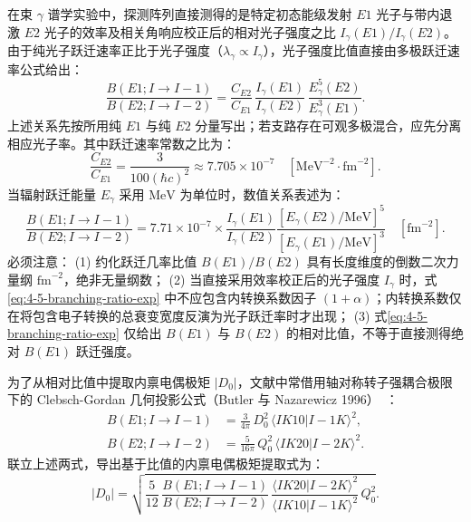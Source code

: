 在束 $\gamma$ 谱学实验中，探测阵列直接测得的是特定初态能级发射 $E1$ 光子与带内退激 $E2$ 光子的效率及相关角响应校正后的相对光子强度之比 $I_\gamma(E1)/I_\gamma(E2)$。由于纯光子跃迁速率正比于光子强度（$\lambda_\gamma \propto I_\gamma$），光子强度比值直接由多极跃迁速率公式给出：
\begin{equation}\label{eq:4-5-branching-ratio-exp}
\frac{B(E1; I \to I-1)}{B(E2; I \to I-2)} = \frac{C_{E2}}{C_{E1}} \, \frac{I_\gamma(E1)}{I_\gamma(E2)} \, \frac{E_\gamma^5(E2)}{E_\gamma^3(E1)} .
\end{equation}
上述关系先按所用纯 $E1$ 与纯 $E2$ 分量写出；若支路存在可观多极混合，应先分离相应光子率。其中跃迁速率常数之比为：
\begin{equation}\label{eq:4-5-rate-constant-ratio}
\frac{C_{E2}}{C_{E1}} = \frac{3}{100 (\hbar c)^2} \approx 7.705 \times 10^{-7} \quad [\mathrm{MeV}^{-2} \cdot \mathrm{fm}^{-2}] .
\end{equation}
当辐射跃迁能量 $E_\gamma$ 采用 $\mathrm{MeV}$ 为单位时，数值关系表述为：
\begin{equation}\label{eq:4-5-ratio-mev}
\frac{B(E1; I \to I-1)}{B(E2; I \to I-2)} = 7.71 \times 10^{-7} \times \frac{I_\gamma(E1)}{I_\gamma(E2)} \frac{[E_\gamma(E2)/\mathrm{MeV}]^5}{[E_\gamma(E1)/\mathrm{MeV}]^3} \quad [\mathrm{fm}^{-2}] .
\end{equation}
必须注意：
(1) 约化跃迁几率比值 $B(E1)/B(E2)$ 具有长度维度的倒数二次力量纲 $\mathrm{fm}^{-2}$，绝非无量纲数；
(2) 当直接采用效率校正后的光子强度 $I_\gamma$ 时，式\eqref{eq:4-5-branching-ratio-exp} 中不应包含内转换系数因子 $(1+\alpha)$；内转换系数仅在将包含电子转换的总衰变宽度反演为光子跃迁率时才出现；
(3) 式\eqref{eq:4-5-branching-ratio-exp} 仅给出 $B(E1)$ 与 $B(E2)$ 的相对比值，不等于直接测得绝对 $B(E1)$ 跃迁强度。

为了从相对比值中提取内禀电偶极矩 $|D_0|$，文献中常借用轴对称转子强耦合极限下的 Clebsch-Gordan 几何投影公式（Butler 与 Nazarewicz 1996）~\cite{butler-1996-octupole-shapes}：
\begin{equation}\label{eq:4-5-cg-formula}
\begin{aligned}
B(E1; I \to I-1) &= \frac{3}{4\pi}\,D_0^2\,\langle I K 1 0 | I-1 K \rangle^2 , \\
B(E2; I \to I-2) &= \frac{5}{16\pi}\,Q_0^2\,\langle I K 2 0 | I-2 K \rangle^2 .
\end{aligned}
\end{equation}
联立上述两式，导出基于比值的内禀电偶极矩提取式为：
\begin{equation}\label{eq:4-5-d0-derived}
|D_0| = \sqrt{\frac{5}{12}\,\frac{B(E1; I \to I-1)}{B(E2; I \to I-2)}\,\frac{\langle I K 2 0 | I-2 K \rangle^2}{\langle I K 1 0 | I-1 K \rangle^2}\,Q_0^2} .
\end{equation}

